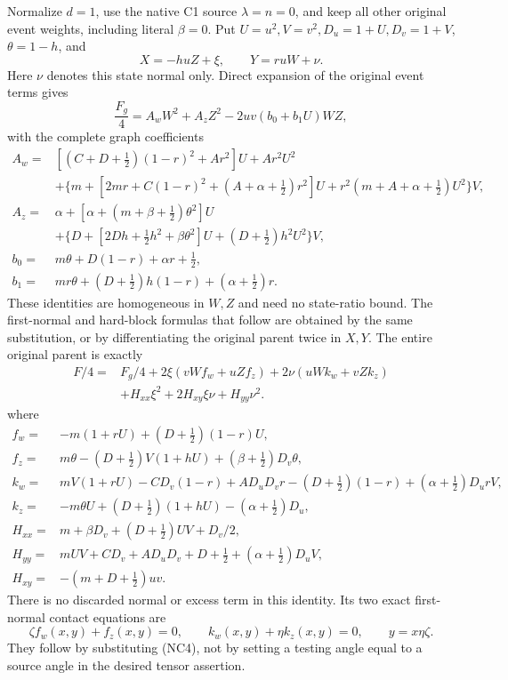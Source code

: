 \label{component:pc15b7caff0a3}

\label{pc15b7caff0a3:sec:r8-small-L-native-normal}

Normalize $d=1$, use the native C1 source $\lambda=n=0$, and keep
all other original event weights, including literal $\beta=0$.
Put $U=u^2,V=v^2,D_u=1+U,D_v=1+V$, $\theta=1-h$, and
\[
             X=-huZ+\xi,\qquad Y=ruW+\nu.
\]
Here $\nu$ denotes this state normal only.  Direct expansion of the
original event terms gives
\[
 \frac{F_g}{4}=A_wW^2+A_zZ^2-2uv(b_0+b_1U)WZ,
\]
with the complete graph coefficients
\[
\begin{aligned}
 A_w={}&[(C+D+\tfrac12)(1-r)^2+Ar^2]U+Ar^2U^2\\
 &+\{m+[2mr+C(1-r)^2+(A+\alpha+\tfrac12)r^2]U
                  +r^2(m+A+\alpha+\tfrac12)U^2\}V,\\
 A_z={}&\alpha+[\alpha+(m+\beta+\tfrac12)\theta^2]U\\
 &+\{D+[2Dh+\tfrac12h^2+\beta\theta^2]U
                     +(D+\tfrac12)h^2U^2\}V,\\
 b_0={}&m\theta+D(1-r)+\alpha r+\tfrac12,\\
 b_1={}&mr\theta+(D+\tfrac12)h(1-r)+(\alpha+\tfrac12)r.
\end{aligned}
\]
These identities are homogeneous in $W,Z$ and need no state-ratio
bound.  The first-normal and hard-block formulas that follow are
obtained by the same substitution, or by differentiating the original
parent twice in $X,Y$.
The entire original parent is
exactly
\[
\begin{split}
 F/4={}&F_g/4+2\xi(vWf_w+uZf_z)+2\nu(uWk_w+vZk_z)\\
 &+H_{xx}\xi^2+2H_{xy}\xi\nu+H_{yy}\nu^2.
\end{split}                                               \tag{SN1}
\]
where
\[
\begin{aligned}
 f_w={}&-m(1+rU)+(D+\tfrac12)(1-r)U,\\
 f_z={}&m\theta-(D+\tfrac12)V(1+hU)
                    +(\beta+\tfrac12)D_v\theta,\\
 k_w={}&mV(1+rU)-CD_v(1-r)+AD_uD_vr
             -(D+\tfrac12)(1-r)+(\alpha+\tfrac12)D_urV,\\
 k_z={}&-m\theta U+(D+\tfrac12)(1+hU)
                              -(\alpha+\tfrac12)D_u,\\
 H_{xx}={}&m+\beta D_v+(D+\tfrac12)UV+D_v/2,\\
 H_{yy}={}&mUV+CD_v+AD_uD_v+D+\tfrac12
                              +(\alpha+\tfrac12)D_uV,\\
 H_{xy}={}&-(m+D+\tfrac12)uv.
\end{aligned}                                                   \tag{SN2}
\]
There is no discarded normal or excess term in this identity.
Its two exact first-normal contact equations are
\[
 \zeta f_w(x,y)+f_z(x,y)=0,\qquad
 k_w(x,y)+\eta k_z(x,y)=0,\qquad y=x\eta\zeta.             \tag{SN3}
\]
They follow by substituting (NC4), not by setting a testing angle
equal to a source angle in the desired tensor assertion.

